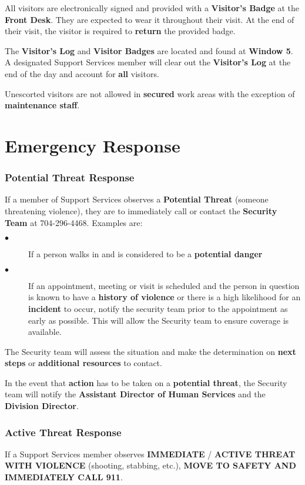 \documentclass{article}
\begin{document}
All visitors are electronically signed and provided with a \textbf{Visitor's Badge} at the \textbf{Front Desk}. They are expected to wear it throughout their visit. At the end of their visit, the visitor is required to \textbf{return} the provided badge. 

The \textbf{Visitor's Log} and \textbf{Visitor Badges} are located and found at \textbf{Window 5}. A designated Support Services member will clear out the \textbf{Visitor's Log} at the end of the day and account for \textbf{all} visitors. 

Unescorted visitors are not allowed in \textbf{secured} work areas with the exception of \textbf{maintenance staff}. 

\section{Emergency Response}
\subsubsection{Potential Threat Response}

If a member of Support Services observes a \textbf{Potential Threat} (someone threatening violence), they are to immediately call or contact the \textbf{Security Team} at 704-296-4468. Examples are:

\begin{description}
    \item[$\bullet$] If a person walks in and is considered to be a \textbf{potential danger}
    \item[$\bullet$] If an appointment, meeting or visit is scheduled and the person in question is known to have a \textbf{history of violence} or there is a high likelihood for an \textbf{incident} to occur, notify the security team prior to the appointment as early as possible. This will allow the Security team to ensure coverage is available.   
\end{description}

The Security team will assess the situation and make the determination on \textbf{next steps} or \textbf{additional resources} to contact.

In the event that \textbf{action} has to be taken on a \textbf{potential threat}, the Security team will notify the \textbf{Assistant Director of Human Services} and the \textbf{Division Director}.


\subsubsection{Active Threat Response}
If a Support Services member observes \textbf{IMMEDIATE} / \textbf{ACTIVE THREAT WITH VIOLENCE} (shooting, stabbing, etc.), \textbf{MOVE TO SAFETY AND IMMEDIATELY CALL 911}.
\end{document}
